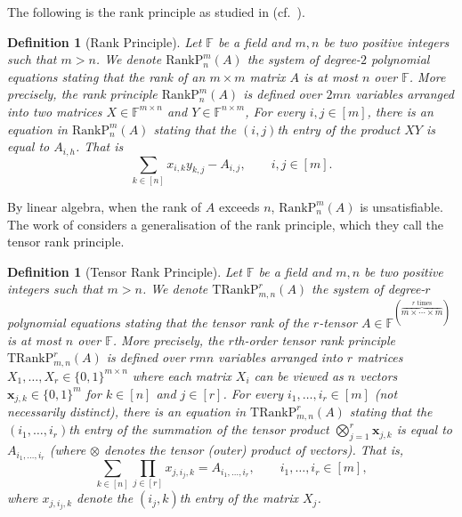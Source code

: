 \documentclass[11pt,letter]{article}
\newtheorem{definition}[theorem]{Definition}
\theoremstyle{remark} %
\newcommand{\RankP}{\mathrm{RankP}} %
\newcommand{\TRankP}{\mathrm{TRankP}} %
\newcommand{\x}{\mathbf{x}}
\newcommand{\F}{\mathbb{F}}
\begin{document}
{    The following is the rank principle as studied in \cite{GGRT25} (cf.~\cite{SU04,Kra09,GGPS23}).

    \begin{definition}[Rank Principle]
        \label{def: rank principle}
        Let $\F$ be a field and $m,n$ be two positive integers such that $m > n$. We denote $\RankP^m_n(A)$ the system of degree-$2$ polynomial equations stating that the rank of an $m \times m$ matrix $A$ is at most $n$ over $\F$. More precisely, the \emph{rank principle} $\RankP_n^m(A)$ is defined over $2mn$ variables arranged into two matrices $X \in \F^{m \times n}$ and $Y \in \F^{n \times m}$, For every $i,j \in [m]$, there is an equation in $\RankP_n^m(A)$ stating that the $(i,j)$th entry of the product $XY$ is equal to $A_{i,h}$. That is
        \begin{equation}
            \label{equa: rank principle}
            \sum_{k \in [n]} x_{i,k} y_{k,j} - A_{i,j}, \qquad i,j \in [m].
        \end{equation}
    \end{definition}
    By linear algebra, when the rank of $A$ exceeds $n$, $\RankP_n^m(A)$ is unsatisfiable.
    The work of \cite{GGLST25} considers a generalisation of the rank principle, which they call the tensor rank principle.


    \begin{definition}[Tensor Rank Principle]
    \label{def: tensor rank principle}
    Let $\F$ be a field and $m, n$ be two positive integers such that $m > n$. We denote $\TRankP_{m,n}^r(A)$ the system of degree-$r$ polynomial equations stating that the tensor rank of the $r$-tensor $A \in \F^{(\overbrace{m \times \cdots \times m}^{r \text{ times}})}$ is at most $n$ over $\F$. 
    More precisely, the \emph{$r$th-order tensor rank principle} $\TRankP_{m,n}^r(A)$ is defined over $rmn$ variables arranged into $r$ matrices $X_1, \dots, X_r \in \{0,1\}^{m \times n}$ where each matrix $X_i$ can be viewed as $n$ vectors $\x_{j,k} \in \{0,1\}^m$ for $k \in [n]$ and $j \in [r]$. For every $i_1, \dots, i_r \in [m]$ (not necessarily distinct), there is an equation in $\TRankP_{m,n}^r (A)$ stating that the $(i_1, \dots, i_r)$th entry of the summation of the tensor product $\bigotimes_{j=1}^r \x_{j,k}$ is equal to $A_{i_1, \dots, i_r}$ (where $\otimes$ denotes the tensor (outer) product of vectors). That is,
    \begin{equation}
        \label{equa: tensor rank principle}
        \sum_{k \in [n]} \prod_{j \in [r]} x_{j,i_j, k} = A_{i_1, \dots, i_r}, \qquad i_1, \dots, i_r \in [m],
    \end{equation}
    where $x_{j,i_j, k}$ denote the $(i_j,k)$th entry of the matrix $X_j$.


\end{definition}}
\end{document}
